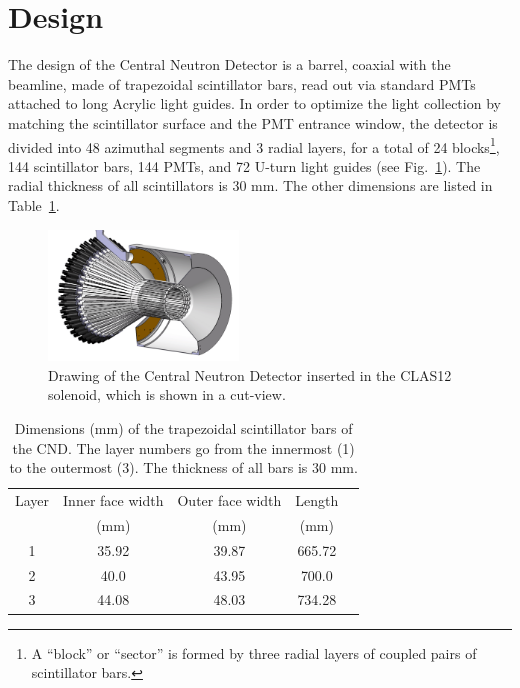 \section{Design}

The design of the Central Neutron Detector is a barrel, coaxial with the beamline, made of trapezoidal scintillator bars, read out via standard PMTs attached to long Acrylic light guides. In order to optimize the light collection by matching the scintillator surface and the PMT entrance window, the detector is divided into 48 azimuthal segments and 3 radial layers, for a total of 24 blocks\footnote{A ``block'' or ``sector'' is formed by three radial layers of coupled pairs of scintillator bars.}, 144 scintillator bars, 144 PMTs, and 72 U-turn light guides (see Fig.~\ref{lab_CND_pic}). The radial thickness of all scintillators is 30 mm. The other dimensions are listed in Table~\ref{lab_scint_dim}.

\begin{figure}[htb]
  \centering
    \includegraphics[width=0.45\textwidth]{Figure/CND_pic.jpg}
 \caption{Drawing of the Central Neutron Detector inserted in the CLAS12 solenoid, which is shown in a cut-view.}
    \label{lab_CND_pic}
\end{figure}

\begin{table}[tbph]
\centering
\begin{tabular}{|c|c|c|c|c|}
\hline
Layer & Inner face width & Outer face width & Length\\
 & (mm) & (mm) & (mm)\\
\hline
1 & 35.92 & 39.87 & 665.72 \\
2 & 40.0 & 43.95 & 700.0 \\
3 & 44.08 & 48.03 & 734.28 \\
\hline
\end{tabular}
\caption{Dimensions (mm) of the trapezoidal scintillator bars of the CND. The layer numbers go from the innermost (1) to the outermost (3). The thickness of all bars is 30 mm.}
\label{lab_scint_dim}

\end{table}

